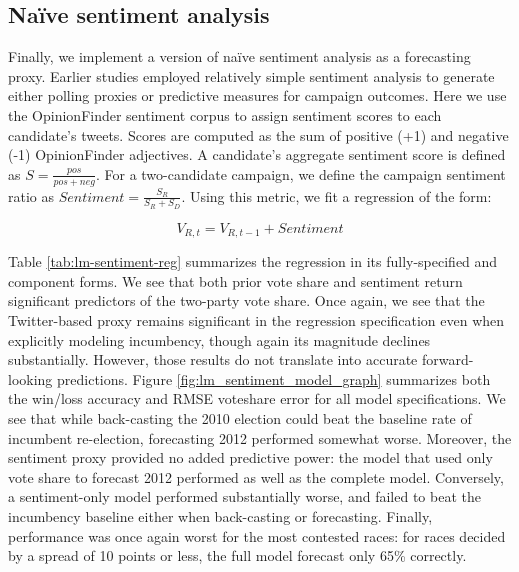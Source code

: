 \documentclass{sig-alternate-2013}
\begin{document}



%

\subsection{Na\"ive sentiment analysis}
\label{sec:naive-sent-analys}

Finally, we implement a version of na\"ive sentiment analysis as a
forecasting proxy. Earlier studies \cite{o2010tweets,van2008good}
employed relatively simple sentiment analysis to generate either
polling proxies or predictive measures for campaign outcomes. Here we
use the OpinionFinder sentiment corpus \cite{wilson2005opinionfinder}
to assign sentiment scores to each candidate's tweets. Scores are
computed as the sum of positive (+1) and negative (-1) OpinionFinder
adjectives. A candidate's aggregate sentiment score is defined as $S =
\frac{pos}{pos + neg}$. For a two-candidate campaign, we define the
campaign sentiment ratio as $Sentiment = \frac{S_R}{S_R + S_D}$. Using
this metric, we fit a regression of the form:

\begin{equation}
  \label{eq:1}
  V_{R, t} = V_{R, t-1} + Sentiment
\end{equation}

Table \ref{tab:lm-sentiment-reg} summarizes the regression in its
fully-specified and component forms. We see that both prior vote share
and sentiment return significant predictors of the two-party vote
share. Once again, we see that the Twitter-based proxy remains
significant in the regression specification even when explicitly
modeling incumbency, though again its magnitude declines
substantially. However, those results do not translate into accurate
forward-looking predictions. Figure \ref{fig:lm_sentiment_model_graph}
summarizes both the win/loss accuracy and RMSE voteshare error for all
model specifications. We see that while back-casting the 2010 election
could beat the baseline rate of incumbent re-election, forecasting
2012 performed somewhat worse. Moreover, the sentiment proxy provided
no added predictive power: the model that used only vote share to
forecast 2012 performed as well as the complete model. Conversely, a
sentiment-only model performed substantially worse, and failed to beat
the incumbency baseline either when back-casting or
forecasting. Finally, performance was once again worst for the most
contested races: for races decided by a spread of 10 points or less,
the full model forecast only 65\% correctly.
\end{document}
